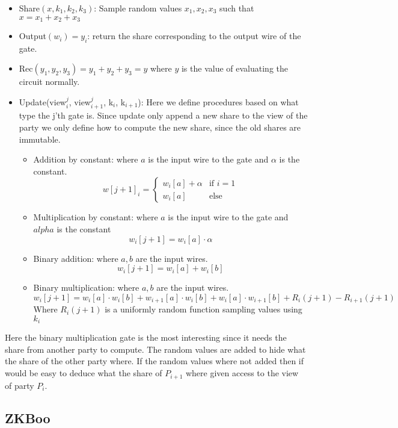\begin{itemize}
  \item Share$(x, k_{1}, k_{2}, k_{3})$: Sample random values
    $x_{1}, x_{2}, x_{3}$ such that $x = x_{1} + x_{2} + x_{3}$
  \item Output$(w_{i}) = y_{i}$: return the share corresponding to the output wire of
    the gate.
  \item Rec$(y_{1}, y_{2}, y_{3}) = y_{1} + y_{2} + y_{3} = y$ where $y$ is the
    value of evaluating the circuit normally.
  \item Update(view$^{j}_{i}$, view$^{j}_{i+1}$, k$_{i}$, k$_{i+1}$): Here we
    define procedures based on what type the j'th gate is. Since update only
    append a new share to the view of the party we only define how to compute
    the new share, since the old shares are immutable.
    \begin{itemize}
      \item Addition by constant: where $a$ is the input wire to the gate
        and $\alpha$ is the constant.
        $$ w[j+1]_{i} =
        \begin{cases} w_{i}[a] + \alpha & \text{if } i = 1 \\
                      w_{i}[a]          & \text{else}       %
        \end{cases}$$
      \item Multiplication by constant: where $a$ is the input wire to the gate
        and $alpha$ is the constant
        $$ w_{i}[j+1] = w_{i}[a] \cdot \alpha$$
      \item Binary addition: where $a, b$ are the input wires.
        $$
        w_{i}[j+1] = w_{i}[a] + w_{i}[b]
        $$
      \item Binary multiplication: where $a, b$ are the input wires.
        $$
        w_{i}[j+1] = w_{i}[a] \cdot w_{i}[b] + w_{i+1}[a] \cdot w_{i}[b] + w_{i}[a] \cdot w_{i+1}[b] + R_{i}(j+1) - R_{i+1}(j+1)
        $$
        Where $R_{i}(j+1)$ is a uniformly random function sampling values using $k_{i}$
    \end{itemize}
\end{itemize}

Here the binary multiplication gate is the most interesting since it needs the
share from another party to compute. The random values are added to hide what
the share of the other party where. If the random values where not added then if
would be easy to deduce what the share of $P_{i+1}$ where given access to the
view of party $P_{i}$.


\subsection{ZKBoo}
\label{subsec:general:zkboo}



